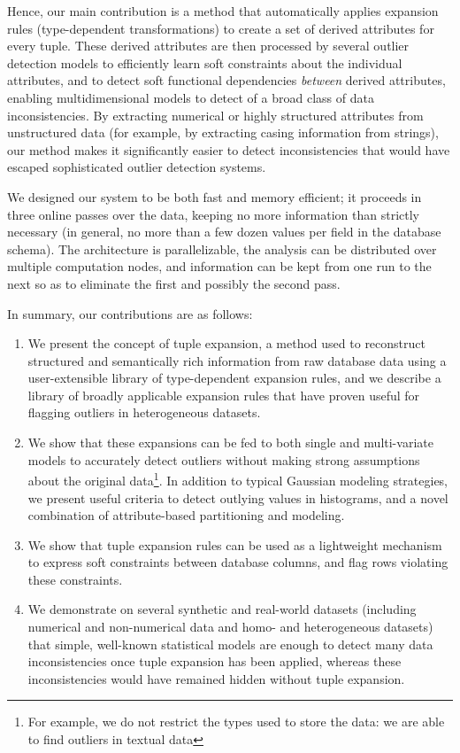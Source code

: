 Hence, our main contribution is a method that automatically applies expansion rules (type-dependent transformations) to create a set of derived attributes for every tuple. These derived attributes are then processed by several outlier detection models to efficiently learn soft constraints about the individual attributes, and to detect soft functional dependencies \textit{between} derived attributes, enabling multidimensional models to detect of a broad class of data inconsistencies. By extracting numerical or highly structured attributes from unstructured data (for example, by extracting casing information from strings), our method makes it significantly easier to detect inconsistencies that would have escaped sophisticated outlier detection systems.

We designed our system to be both fast and memory efficient; it proceeds in three online passes over the data, keeping no more information than strictly necessary (in general, no more than a few dozen values per field in the database schema). The architecture is parallelizable, the analysis can be distributed over multiple computation nodes, and information can be kept from one run to the next so as to eliminate the first and possibly the second pass.

In summary, our contributions are as follows:
\begin{enumerate}
\item We present the concept of tuple expansion, a method used to reconstruct structured and semantically rich information from raw database data using a user-extensible library of type-dependent expansion rules, and we describe a library of broadly applicable expansion rules that have proven useful for flagging outliers in heterogeneous datasets.
\item We show that these expansions can be fed to both single and multi-variate models to accurately detect outliers without making strong assumptions about the original data\footnote{For example, we do not restrict the types used to store the data: we are able to find outliers in textual data}. In addition to typical Gaussian modeling strategies, we present useful criteria to detect outlying values in histograms, and a novel combination of attribute-based partitioning and modeling.
\item We show that tuple expansion rules can be used as a lightweight mechanism to express soft constraints between database columns, and flag rows violating these constraints.
\item We demonstrate on several synthetic and real-world datasets (including numerical and non-numerical data and homo- and heterogeneous datasets) that simple, well-known statistical models are enough to detect many data inconsistencies once tuple expansion has been applied, whereas these inconsistencies would have remained hidden without tuple expansion.
\end{enumerate}

